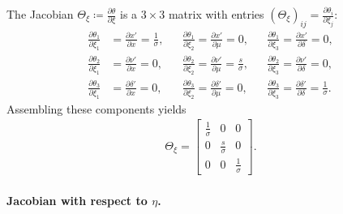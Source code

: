 \documentclass{article}
\begin{document}
The Jacobian $\Theta_\xi \coloneqq \frac{\partial \theta}{\partial \xi}$ is a $3 \times 3$ matrix with entries $(\Theta_\xi)_{ij} = \frac{\partial \theta_i}{\partial \xi_j}$:
%
\begin{align}
  \frac{\partial \theta_1}{\partial \xi_1} & = \frac{\partial x'}{\partial x} = \frac{1}{\sigma}, &  & \frac{\partial \theta_1}{\partial \xi_2} = \frac{\partial x'}{\partial \mu} = 0,                  &  & \frac{\partial \theta_1}{\partial \xi_3} = \frac{\partial x'}{\partial \delta} = 0,                     \\
  \frac{\partial \theta_2}{\partial \xi_1} & = \frac{\partial \nu'}{\partial x} = 0,              &  & \frac{\partial \theta_2}{\partial \xi_2} = \frac{\partial \nu'}{\partial \mu} = \frac{s}{\sigma}, &  & \frac{\partial \theta_2}{\partial \xi_3} = \frac{\partial \nu'}{\partial \delta} = 0,                   \\
  \frac{\partial \theta_3}{\partial \xi_1} & = \frac{\partial \delta'}{\partial x} = 0,           &  & \frac{\partial \theta_3}{\partial \xi_2} = \frac{\partial \delta'}{\partial \mu} = 0,             &  & \frac{\partial \theta_3}{\partial \xi_3} = \frac{\partial \delta'}{\partial \delta} = \frac{1}{\sigma}.
\end{align}
%
Assembling these components yields
%
\begin{align}\label{eq:Theta-xi}
  \Theta_{\xi} =
  \begin{bmatrix}
    \frac{1}{\sigma} & 0                & 0                \\
    0                & \frac{s}{\sigma} & 0                \\
    0                & 0                & \frac{1}{\sigma}
  \end{bmatrix}.
\end{align}

\paragraph{Jacobian with respect to $\eta$.}
\end{document}
